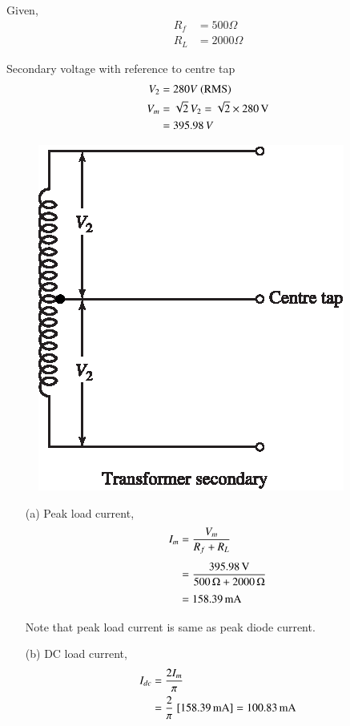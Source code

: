 \begin{solution}
Given, 
\begin{align*}
R_f & = 500 \Omega\\
R_L & = 2000 \Omega
\end{align*}

Secondary voltage with reference to centre tap
\begin{align*}
V_2 & = 280 V \ \text{(RMS)}\\
V_{m}& = \sqrt{2}\, V_2=\sqrt{2}\times 280\text{\,V} \\
& = 395.98\, V
\end{align*}
\begin{figure}[H]
\centering
\includegraphics{chap2/add-fig/S3-EE-02-IN002.eps}
\end{figure}

\begin{itemize}
\item[(a)] Peak load current,
\begin{align*}
I_m & = \frac{V_m}{R_f + R_L}\\[4pt]
& = \frac{395.98 \operatorname{\mathrm{V}}}{500\, \Omega + 2000\, \Omega}\\[3pt]
& = 158.39 \operatorname{mA}
\end{align*}


Note that peak load current is same as peak diode current.

\item[(b)] DC load current, 
\begin{align*}
I_{dc} & = \frac{2I_m}{\pi}\\
& = \frac{2}{\pi}\; [158.39\operatorname{mA}]= 100.83 \operatorname{mA}
\end{align*}


\end{itemize}
\end{solution}
